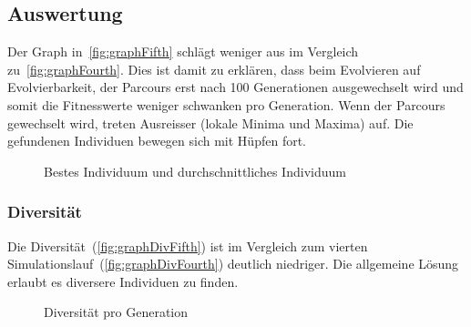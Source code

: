     \subsection{Auswertung\label{sub:fifthAuswertung}}

      Der Graph in~\vref{fig:graphFifth} schlägt weniger aus im Vergleich zu~\vref{fig:graphFourth}.
      Dies ist damit zu erklären, dass beim Evolvieren auf Evolvierbarkeit,
      der Parcours erst nach 100 Generationen ausgewechselt wird und
      somit die Fitnesswerte weniger schwanken pro Generation.
      Wenn der Parcours gewechselt wird, treten Ausreisser (lokale Minima und Maxima) auf.
      Die gefundenen Individuen bewegen sich mit Hüpfen fort.

      \begin{figure}[H]
        \centering
        
        \caption{Bestes Individuum und durchschnittliches Individuum\label{fig:graphFifth}}
      \end{figure}

      \subsubsection{Diversität}

        Die Diversität~(\vref{fig:graphDivFifth}) ist im Vergleich zum
        vierten Simulationslauf~(\vref{fig:graphDivFourth}) deutlich niedriger.
        Die allgemeine Lösung erlaubt es diversere Individuen zu finden.

        \begin{figure}[H]
          \centering
          
          \caption{Diversität pro Generation\label{fig:graphDivFifth}}
        \end{figure}
